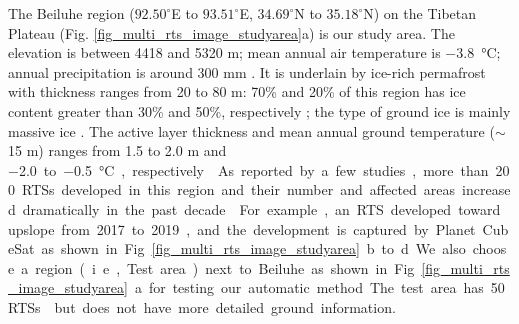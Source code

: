 \documentclass[authoryear,preprint,review,12pt]{elsarticle}
\begin{document}
The Beiluhe region ($92.50^\circ$E to $93.51^\circ$E, $34.69^\circ$N to $35.18^\circ$N) on the Tibetan Plateau (Fig. \ref{fig_multi_rts_image_studyarea}a) is our study area.
The elevation is between 4418 and 5320 m; mean annual air temperature is \SI{-3.8}{\celsius}; annual precipitation is around 300 mm  \citep{luo_thermokarst_2015}.
It is underlain by ice-rich permafrost with thickness ranges from 20 to 80 m: 70\% and 20\% of this region has ice content greater than 30\% and 50\%, respectively \citep{zhou_geocryology_2000, luo_thermokarst_2015}; 
the type of ground ice is mainly massive ice \citep{guodong1983mechanism}. 
The active layer thickness and mean annual ground temperature ($\sim$15 m) ranges from 1.5 to 2.0 m and \SI{-2.0} to \SI{-0.5}{\celsius}, respectively \citep{zhou_geocryology_2000, wu2010changes, luo_thermokarst_2015,  wu2015changes}. 
As reported by a few studies, more than 200 RTSs developed in this region and their number and affected areas increased dramatically in the past decade \citep{huang2020using,luo2019recent}.  
For example, an RTS developed toward upslope from 2017 to 2019, and the development is captured by Planet CubeSat as shown in Fig. \ref{fig_multi_rts_image_studyarea} b to d. 
We also choose a region (i.e., Test area) next to Beiluhe as shown in Fig. \ref{fig_multi_rts_image_studyarea}a for testing our automatic method. 
The test area has 50 RTSs \citep{huang2020using} but does not have more detailed ground information. 


\end{document}
